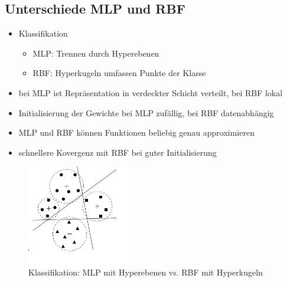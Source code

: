 \subsection{Unterschiede MLP und RBF}
\begin{itemize}
    \item Klassifikation
        \begin{itemize}
            \item MLP: Trennen durch Hyperebenen
            \item RBF: Hyperkugeln umfassen Punkte der Klasse
        \end{itemize}
    \item bei MLP ist Repräsentation in verdeckter Schicht verteilt, bei RBF lokal
    \item Initialisierung der Gewichte bei MLP zufällig, bei RBF datenabhängig
    \item MLP und RBF können Funktionen beliebig genau approximieren
    \item schnellere Kovergenz mit RBF bei guter Initialisierung
\end{itemize}

\begin{figure}[h]
    \centering
    \includegraphics[width=0.4\textwidth]{img/RBF/MLPvsRBF.png}
    \caption{Klassifikation: MLP mit Hyperebenen vs. RBF mit Hyperkugeln}
    \label{ch_RBF_MLPvsRBF}
\end{figure}
